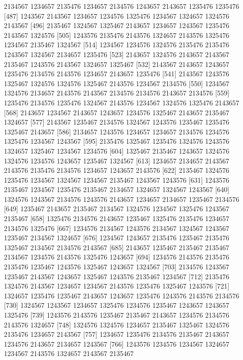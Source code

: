 \documentclass{scrartcl}
\begin{document}
\begin{Schunk}
\begin{Soutput}
 [478] 2134567 1234657 2135476 1234657 2134576 1243657 2143657 1235476 1235476
 [487] 1243567 2143567 1234657 1234576 1325476 1234567 1324657 1324576 2143567
 [496] 2135467 1324567 1325467 2143657 1234657 1243567 1235476 2143567 1324576
 [505] 1243576 2135476 2143576 1324657 2143576 1325476 1234567 2135467 1324567
 [514] 1234567 1234576 1324576 2135476 2135476 1243567 1324567 2134657 1235476
 [523] 2143657 1324576 2143657 2143567 2135467 1243576 2143567 1324657 1325467
 [532] 2143567 2143657 1243657 1235476 2134576 2143576 1234657 2143657 1235476
 [541] 2143567 1243576 1325467 1324576 1324576 1325467 2143576 1234567 2134576
 [550] 1234567 1324576 2134657 2143576 2143567 2134576 2134576 2143657 2134576
 [559] 1235476 2134576 1235476 1324567 2143576 1234567 1324576 1325476 2143657
 [568] 2143657 1234567 2143657 1243657 1234576 1325467 2143657 2135467 1324657
 [577] 2143567 1235467 2134576 1324567 1243576 1235467 1235476 1325467 2143657
 [586] 2134657 1243576 1234657 1234657 2134576 1234576 1325476 1234567 1243567
 [595] 2135476 1325467 1235476 1324576 1243576 1324657 1325467 1234567 1234576
 [604] 1325467 2135467 1243657 1324576 1324576 1234576 1243657 1235467 1324567
 [613] 1234657 2134657 2143567 2143576 2135476 2134576 1234657 1243657 2143576
 [622] 2135467 1324576 1235476 1234567 1324567 1234567 2135467 1243567 1243576
 [631] 1243576 2135467 1234567 1235476 2135467 2134657 1324657 1324567 1243567
 [640] 1324576 1243567 2134576 1243576 2143657 1234657 2134657 1235467 2134576
 [649] 1235467 2143657 2135467 2134567 1324576 1234567 1325476 1243567 2135467
 [658] 1325476 2134576 2143657 1235467 1325476 2135476 1234657 2134576 1325476
 [667] 1234576 2134567 1243576 2134567 1324567 1243567 1235467 2134567 1324657
 [676] 1234567 1243657 2135476 1235467 2135476 1325467 2134567 2134576 2143567
 [685] 2143657 1235467 2135467 2135467 2134567 1234576 2143576 1325476 1243657
 [694] 1234576 2143576 2135476 2135476 1235467 1243576 1325467 1243657 1324567
 [703] 2134576 1243567 1235467 2143567 1243657 1325467 1243576 2135467 1234567
 [712] 2135476 1324576 2143567 1234657 1234567 2143576 1235476 1325467 1243576
 [721] 1324657 1235476 1235467 2143657 1243657 1235476 1243576 2143576 2134576
 [730] 1324567 1243567 1234657 1325476 1234576 1235467 1243657 1243657 1325476
 [739] 1243576 2143576 1235467 2135467 2143657 1234576 2134576 2143576 1324657
 [748] 1324576 1324576 1234657 2135467 1325467 1324576 2135476 1234657 2143567
 [757] 1234657 1235476 2134576 2135467 2143657 1234576 2143657 2134657 1243567
 [766] 1243576 1234576 1234567 1324657 1234567 2143576 1324657 2143567 2135467

\end{Soutput}
\end{Schunk}
\end{document}
